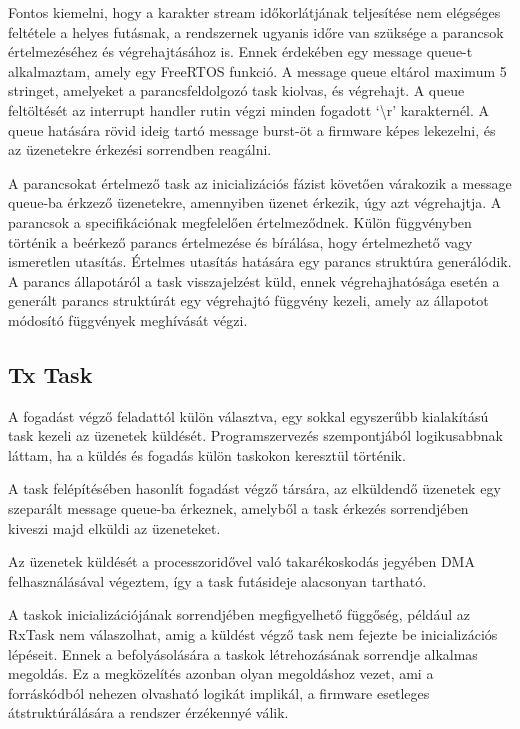 \medskip

Fontos kiemelni, hogy a karakter stream időkorlátjának teljesítése nem elégséges
feltétele a helyes futásnak, a rendszernek ugyanis időre van szüksége a parancsok
értelmezéséhez és végrehajtásához is. Ennek érdekében egy message queue-t
alkalmaztam, amely egy FreeRTOS funkció. A message queue eltárol maximum 5
stringet, amelyeket a parancsfeldolgozó task kiolvas, és végrehajt. A queue
feltöltését az interrupt handler rutin végzi minden fogadott `\textbackslash{}r'
karakternél. A queue hatására rövid ideig tartó message burst-öt a firmware képes
lekezelni, és az üzenetekre érkezési sorrendben reagálni. 

\medskip

A parancsokat értelmező task az inicializációs fázist követően várakozik a
message queue-ba érkzező üzenetekre, amennyiben üzenet érkezik, úgy azt
végrehajtja. A parancsok a specifikációnak megfelelően értelmeződnek. Külön
függvényben történik a beérkező parancs értelmezése és bírálása, hogy
értelmezhető vagy ismeretlen utasítás. Értelmes utasítás hatására egy parancs
struktúra generálódik. A parancs állapotáról a task visszajelzést küld, ennek
végrehajhatósága esetén a generált parancs struktúrát egy végrehajtó függvény
kezeli, amely az állapotot módosító függvények meghívását végzi. 

\subsection{Tx Task}

A fogadást végző feladattól külön választva, egy sokkal egyszerűbb kialakítású
task kezeli az üzenetek küldését. Programszervezés szempontjából logikusabbnak
láttam, ha a küldés és fogadás külön taskokon keresztül történik.

A task felépítésében hasonlít fogadást végző társára, az elküldendő üzenetek egy
szeparált message queue-ba érkeznek, amelyből a task érkezés sorrendjében kiveszi
majd elküldi az üzeneteket.

Az üzenetek küldését a processzoridővel való takarékoskodás jegyében DMA
felhasználásával végeztem, így a task futásideje alacsonyan tartható. 

\medskip

A taskok inicializációjának sorrendjében megfigyelhető függőség, például az
RxTask nem válaszolhat, amig a küldést végző task nem fejezte be inicializációs
lépéseit. Ennek a befolyásolására a taskok létrehozásának sorrendje alkalmas
megoldás. Ez a megközelítés azonban olyan megoldáshoz vezet, ami a forráskódból
nehezen olvasható logikát implikál, a firmware esetleges átstruktúrálására a
rendszer érzékennyé válik.

